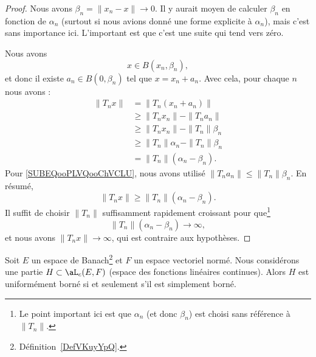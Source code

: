 \begin{proof}
    Nous avons \( \beta_n=\| x_n-x \|\to 0\). Il y aurait moyen de calculer \( \beta_n\) en fonction de \( \alpha_n\) (surtout si nous avions donné une forme explicite à \( \alpha_n\)), mais c'est sans importance ici. L'important est que c'est une suite qui tend vers zéro.

    Nous avons
    \begin{equation}
        x\in B(x_n,\beta_n),
    \end{equation}
    et donc il existe \( a_n\in B(0,\beta_n)\) tel que \( x=x_n+a_n\). Avec cela, pour chaque \( n\) nous avons :
    \begin{subequations}
        \begin{align}
            \| T_nx \|&=\| T_n(x_n+a_n) \|\\
            &\geq\| T_nx_n \|-\| T_na_n \|\\
            &\geq \| T_nx_n \|-\| T_n \|\beta_n     \label{SUBEQooPLVQooChVCLU}\\
        &\geq \| T_n \|\alpha_n-\| T_n \|\beta_n\\
        &=\| T_n \|(\alpha_n-\beta_n).
        \end{align}
    \end{subequations}
    Pour \ref{SUBEQooPLVQooChVCLU}, nous avons utilisé \( \| T_na_n \|\leq \| T_n \|\beta_n\). En résumé,
    \begin{equation}
        \| T_nx \|\geq \| T_n \|(\alpha_n-\beta_n).
    \end{equation}
    Il suffit de choisir \( \| T_n \|\) suffisamment rapidement croissant pour que\footnote{Le point important ici est que \( \alpha_n\) (et donc \( \beta_n\)) est choisi sans référence à \( \| T_n \|\).}
    \begin{equation}
       \| T_n \|(\alpha_n-\beta_n)\to \infty,
    \end{equation}
    et nous avons \( \| T_nx \|\to \infty\), qui est contraire aux hypothèses.
\end{proof}

\begin{theorem} \label{ThoPFBMHBN}
    Soit \( E\) un espace de Banach\footnote{Définition~\ref{DefVKuyYpQ}.} et \( F\) un espace vectoriel normé. Nous considérons une partie \( H\subset \aL_c(E,F)\) (espace des fonctions linéaires continues). Alors \( H\) est uniformément borné si et seulement s'il est simplement borné.
\end{theorem}

